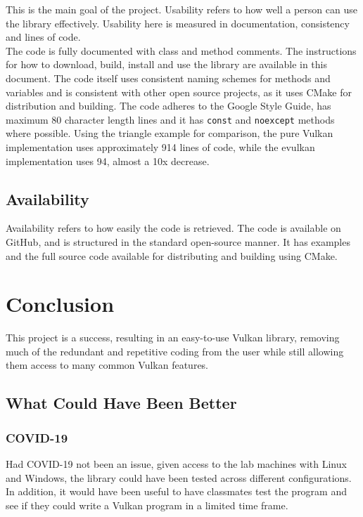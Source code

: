 \documentclass[12pt]{report}
\theoremstyle{definition}
\begin{document}
      This is the main goal of the project. Usability refers to how well a person
      can use the library effectively. Usability here is measured in
      documentation, consistency and lines of code. \\

      The code is fully documented with class and method comments. The
      instructions for how to download, build, install and use the library
      are available in this document. The code itself uses consistent naming
      schemes for methods and variables and is consistent with other open source
      projects, as it uses CMake for distribution and building. The code
      adheres to the Google Style Guide, has maximum 80 character length
      lines and it has \texttt{const} and \texttt{noexcept} methods where possible. Using
      the triangle example for comparison, the pure Vulkan implementation
      uses approximately 914 lines of code, while the evulkan implementation
      uses 94, almost a 10x decrease. 

    \section{Availability}

      Availability refers to how easily the code is retrieved. The code is
      available on GitHub, and is structured in the standard open-source
      manner. It has examples and the full source code available for
      distributing and building using CMake.

  \chapter{Conclusion}

    This project is a success, resulting in an easy-to-use Vulkan library,
    removing much of the redundant and repetitive coding from the user
    while still allowing them access to many common Vulkan features.

    \section{What Could Have Been Better}

     \subsection{COVID-19}

      Had COVID-19 not been an issue, given access to the lab machines with
      Linux and Windows, the library could have been tested across different
      configurations. In addition, it would have been useful to have
      classmates test the program and see if they could write a Vulkan
      program in a limited time frame.
\end{document}
